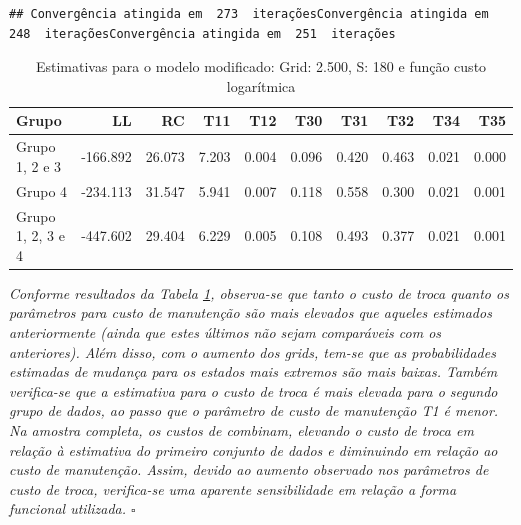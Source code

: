 \documentclass[12pt,a4paper]{article}
\newenvironment{Shaded}{\begin{snugshade}}{\end{snugshade}}
\newcommand{\DataTypeTok}[1]{\textcolor[rgb]{0.13,0.29,0.53}{#1}}
\newcommand{\DecValTok}[1]{\textcolor[rgb]{0.00,0.00,0.81}{#1}}
\newcommand{\KeywordTok}[1]{\textcolor[rgb]{0.13,0.29,0.53}{\textbf{#1}}}
\newcommand{\NormalTok}[1]{#1}
\newcommand{\OperatorTok}[1]{\textcolor[rgb]{0.81,0.36,0.00}{\textbf{#1}}}
\newcommand{\OtherTok}[1]{\textcolor[rgb]{0.56,0.35,0.01}{#1}}
\newcommand{\StringTok}[1]{\textcolor[rgb]{0.31,0.60,0.02}{#1}}
\begin{document}
\begin{verbatim}
## Convergência atingida em  273  iteraçõesConvergência atingida em  248  iteraçõesConvergência atingida em  251  iterações
\end{verbatim}

\begin{Shaded}
\end{Shaded}

\begin{table}[ht]
\centering
\begin{tabular}{lrrrrrrrrr}
  \hline
Grupo & LL & RC & T11 & T12 & T30 & T31 & T32 & T34 & T35 \\ 
  \hline
Grupo 1, 2 e 3 & -166.892 & 26.073 & 7.203 & 0.004 & 0.096 & 0.420 & 0.463 & 0.021 & 0.000 \\ 
  Grupo 4 & -234.113 & 31.547 & 5.941 & 0.007 & 0.118 & 0.558 & 0.300 & 0.021 & 0.001 \\ 
  Grupo 1, 2, 3 e 4 & -447.602 & 29.404 & 6.229 & 0.005 & 0.108 & 0.493 & 0.377 & 0.021 & 0.001 \\ 
   \hline
\end{tabular}
\caption{Estimativas para o modelo modificado: Grid: 2.500, S: 180 e função custo logarítmica} 
\label{tab:4}
\end{table}

\emph{Conforme resultados da Tabela \ref{tab:4}, observa-se que tanto o
custo de troca quanto os parâmetros para custo de manutenção são mais
elevados que aqueles estimados anteriormente (ainda que estes últimos
não sejam comparáveis com os anteriores). Além disso, com o aumento dos
grids, tem-se que as probabilidades estimadas de mudança para os estados
mais extremos são mais baixas. Também verifica-se que a estimativa para
o custo de troca é mais elevada para o segundo grupo de dados, ao passo
que o parâmetro de custo de manutenção T1 é menor. Na amostra completa,
os custos de combinam, elevando o custo de troca em relação à estimativa
do primeiro conjunto de dados e diminuindo em relação ao custo de
manutenção. Assim, devido ao aumento observado nos parâmetros de custo
de troca, verifica-se uma aparente sensibilidade em relação a forma
funcional utilizada. \(\square\)}
\end{document}

